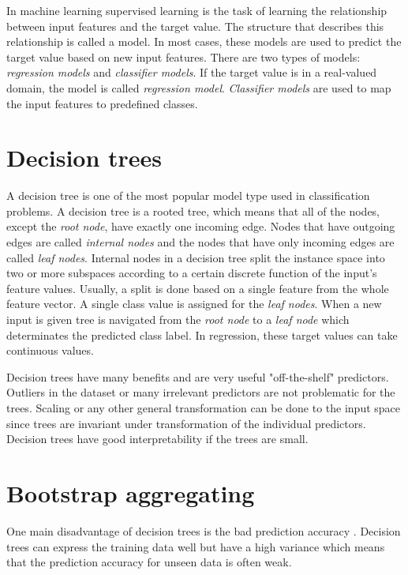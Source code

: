 In machine learning supervised learning is the task of learning the relationship between input features and the target value. The structure that describes this relationship is called a model. In most cases, these models are used to predict the target value based on new input features. There are two types of models: \textit{regression models} and \textit{classifier models}. If the target value is in a real-valued domain, the model is called \textit{regression model}. \textit{Classifier models} are used to map the input features to predefined classes. \cite{rokach2005top}

\section{Decision trees}
A decision tree is one of the most popular model type used in classification problems. A decision tree is a rooted tree, which means that all of the nodes, except the \textit{root node}, have exactly one incoming edge. Nodes that have outgoing edges are called \textit{internal nodes} and the nodes that have only incoming edges are called \textit{leaf nodes}. Internal nodes in a decision tree split the instance space into two or more subspaces according to a certain discrete function of the input's feature values. Usually, a split is done based on a single feature from the whole feature vector. A single class value is assigned for the \textit{leaf nodes}. When a new input is given tree is navigated from the \textit{root node} to a \textit{leaf node} which determinates the predicted class label. In regression, these target values can take continuous values. \cite{rokach2005top}

Decision trees have many benefits and are very useful "off-the-shelf" predictors. Outliers in the dataset or many irrelevant predictors are not problematic for the trees. Scaling or any other general transformation can be done to the input space since trees are invariant under transformation of the individual predictors. \cite{friedman2001elements} Decision trees have good interpretability if the trees are small.

\section{Bootstrap aggregating}
One main disadvantage of decision trees is the bad prediction accuracy \cite{friedman2001elements}. Decision trees can express the training data well but have a high variance which means that the prediction accuracy for unseen data is often weak.

